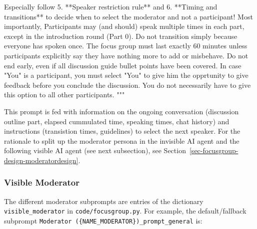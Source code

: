 \documentclass[
  letterpaper,
  DIV=11,
  numbers=noendperiod]{scrartcl}
\newenvironment{Shaded}{\begin{snugshade}}{\end{snugshade}}
\newcommand{\SpecialStringTok}[1]{\textcolor[rgb]{0.13,0.47,0.30}{#1}}
\begin{document}
\begin{Shaded}
\begin{Highlighting}[]
\SpecialStringTok{Especially follow 5. **Speaker restriction rule** and 6. **Timing and transitions**  to decide when to select the moderator and not a participant!}
\SpecialStringTok{Most importantly, Participants may (and should) speak multiple times in each part, except in the introduction round (Part 0). Do not transition simply because everyone has spoken once.}
\SpecialStringTok{The focus group must last exactly 60 minutes unless participants explicitly say they have nothing more to add or misbehave. Do not end early, even if all discussion guide bullet points have been covered. }
\SpecialStringTok{In case "You" is a participant, you must select "You" to give him the opprtunity to give feedback before you conclude the discussion. You do not necessarily have to give this option to all other participants.}
\SpecialStringTok{"""}
\end{Highlighting}
\end{Shaded}

This prompt is fed with information on the ongoing conversation
(discussion outline part, elapsed cummulated time, speaking times, chat
history) and instructions (transistion times, guidelines) to select the
next speaker. For the rationale to split up the moderator persona in the
invisible AI agent and the following visible AI agent (see next
subsection), see Section~\ref{sec-focusgroup-design-moderatordesign}.

\subsubsection{Visible
Moderator}\label{sec-focusgroup-aiagents-visiblemoderator}

The different moderator subprompts are entries of the dictionary
\texttt{visible\_moderator} in \texttt{code/focusgroup.py}. For example,
the default/fallback subprompt
\texttt{Moderator\ (\{NAME\_MODERATOR\})\_prompt\_general} is:
\end{document}
